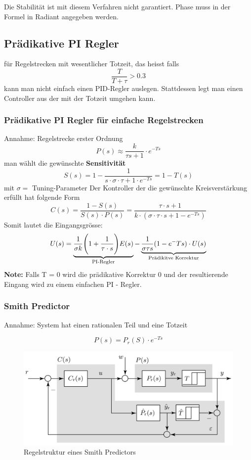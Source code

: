         Die Stabilität ist mit diesem Verfahren nicht garantiert. Phase muss in der Formel in Radiant angegeben werden. 
\subsection{Prädikative PI Regler}
    für Regelstrecken mit wesentlicher Totzeit, das heisst falls 
    \[\frac{T}{T+\tau}>0.3\]
    kann man nicht einfach einen PID-Regler auslegen. Stattdessen legt man einen Controller aus der mit der Totzeit umgehen kann. 

    
    \subsubsection{Prädikative PI Regler für einfache Regelstrecken}
        Annahme: Regelstrecke erster Ordnung 
        \[P(s)\approx \frac{k}{\tau s + 1}\cdot e^{-Ts}\]
        man wählt die gewünschte \textbf{Sensitivität} 
        \[S(s) = 1- \frac{1}{s\cdot\sigma\cdot \tau + 1 \cdot e^{-Ts}} = 1 - T(s) \]
        mit $\sigma = $ Tuning-Parameter
        Der Kontroller der die gewünschte Kreisverstärkung erfüllt hat folgende Form 
        \[C(s) =\frac{1-S(s)}{S(s)\cdot P(s)}= \frac{\tau\cdot s+1}{k\cdot(\sigma\cdot\tau\cdot s+ 1-e^{-Ts})}\]
        Somit lautet die Eingangsgrösse: 
        \[U(s)=\underbrace{\frac{1}{\sigma k}\Bigg(1+\frac{1}{\tau\cdot s}\Bigg)E(s)}_{\textnormal{PI-Regler}} - \underbrace{\frac{1}{\sigma\tau s}(1-e^-{Ts})\cdot U(s)}_{\textnormal{Prädikitve Korrektur}}\] 
    \textbf{Note:} Falls T = 0 wird die prädikative Korrektur 0 und der resultierende Eingang wird zu einem einfachen PI - Regler.
    \subsubsection{Smith Predictor}
    Annahme: System hat einen rationalen Teil und eine Totzeit
    
    \[P(s) = P_r(S)\cdot e^{-Ts}\]
    \begin{figure}[H]
        \centering
        \includegraphics[width = 0.55\linewidth]{images/02/Smithpredictor.jpg}
        \caption{Regelstruktur eines Smith Predictors}
    \end{figure}
    

